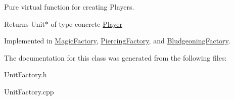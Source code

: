 Pure virtual function for creating Players. 

\begin{DoxyReturn}{Returns}
Unit$\ast$ of type concrete \hyperlink{class_player}{Player} 
\end{DoxyReturn}


Implemented in \hyperlink{class_magic_factory_a3021b979bd991e32e311c8869d500b46}{Magic\+Factory}, \hyperlink{class_piercing_factory_a3a2f3736e85a5c4b0ad0160b1b34d796}{Piercing\+Factory}, and \hyperlink{class_bludgeoning_factory_adb269785fcab1a468aabe771cf4f4336}{Bludgeoning\+Factory}.



The documentation for this class was generated from the following files\+:\begin{DoxyCompactItemize}
\item 
Unit\+Factory.\+h\item 
Unit\+Factory.\+cpp\end{DoxyCompactItemize}
